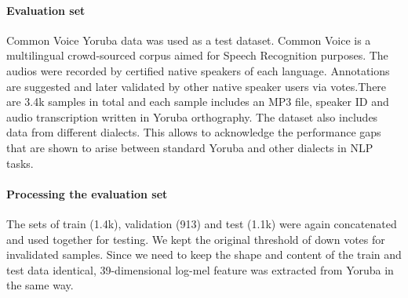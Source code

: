 \documentclass[11pt]{article}
\begin{document}
\paragraph{Evaluation set} Common Voice Yoruba data was used as a test dataset. Common Voice is a multilingual crowd-sourced corpus aimed for Speech Recognition purposes. \cite{Ardila2020} The audios were recorded by certified native speakers of each language. Annotations are suggested and later validated by other native speaker users via votes.There are 3.4k samples in total and each sample includes an MP3 file, speaker ID and audio transcription written in Yoruba orthography. The dataset also includes data from different dialects. This allows to acknowledge the performance gaps that are shown to arise between standard Yoruba and other dialects in NLP tasks. \citet{AhiaEtAl2024}
\paragraph{Processing the evaluation set} The sets of train (1.4k), validation (913) and test (1.1k) were again concatenated and used together for testing. We kept the original threshold of down votes for invalidated samples. Since we need to keep the shape and content of the train and test data identical, 39-dimensional log-mel feature was extracted from Yoruba in the same way.
\end{document}
